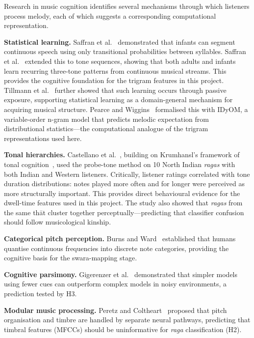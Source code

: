 \documentclass[11pt,a4paper]{article}
\begin{document}
{Research in music cognition identifies several mechanisms through which listeners process melody, each of which suggests a corresponding computational representation.

\textbf{Statistical learning.} Saffran et al.~\cite{saffran1996} demonstrated that infants can segment continuous speech using only transitional probabilities between syllables. Saffran et al.~\cite{saffran1999} extended this to tone sequences, showing that both adults and infants learn recurring three-tone patterns from continuous musical streams. This provides the cognitive foundation for the trigram features in this project. Tillmann et al.~\cite{tillmann2000} further showed that such learning occurs through passive exposure, supporting statistical learning as a domain-general mechanism for acquiring musical structure. Pearce and Wiggins~\cite{pearce2012} formalised this with IDyOM, a variable-order n-gram model that predicts melodic expectation from distributional statistics---the computational analogue of the trigram representations used here.

\textbf{Tonal hierarchies.} Castellano et al.~\cite{castellano1984}, building on Krumhansl's framework of tonal cognition~\cite{krumhansl1990}, used the probe-tone method on 10 North Indian \textit{ragas} with both Indian and Western listeners. Critically, listener ratings correlated with tone duration distributions: notes played more often and for longer were perceived as more structurally important. This provides direct behavioural evidence for the dwell-time features used in this project. The study also showed that \textit{ragas} from the same th\=at cluster together perceptually---predicting that classifier confusion should follow musicological kinship.

\textbf{Categorical pitch perception.} Burns and Ward~\cite{burns1978} established that humans quantise continuous frequencies into discrete note categories, providing the cognitive basis for the swara-mapping stage.

\textbf{Cognitive parsimony.} Gigerenzer et al.~\cite{gigerenzer1999} demonstrated that simpler models using fewer cues can outperform complex models in noisy environments, a prediction tested by H3.

\textbf{Modular music processing.} Peretz and Coltheart~\cite{peretz2003} proposed that pitch organisation and timbre are handled by separate neural pathways, predicting that timbral features (MFCCs) should be uninformative for \textit{raga} classification (H2).

}
\end{document}
